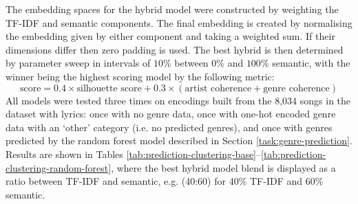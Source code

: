 \documentclass{article}
\begin{document}
The embedding spaces for the hybrid model were constructed by weighting the TF-IDF and semantic components. The final embedding is created by normalising the embedding given by either component and taking a weighted sum. If their dimensions differ then zero padding is used. The best hybrid is then determined by parameter sweep in intervals of $10\%$ between $0\%$ and $100\%$ semantic, with the winner being the highest scoring model by the following metric: $$\text{score} = 0.4 \times \text{silhouette score} + 0.3 \times (\text{artist coherence} + \text{genre coherence})$$
All models were tested three times on encodings built from the 8,034 songs in the dataset with lyrics: once with no genre data, once with one-hot encoded genre data with an `other' category (i.e. no predicted genres), and once with genres predicted by the random forest model described in Section \ref{task:genre-prediction}. Results are shown in Tables \ref{tab:prediction-clustering-base}--\ref{tab:prediction-clustering-random-forest}, where the best hybrid model blend is displayed as a ratio between TF-IDF and semantic, e.g. (40:60) for 40\% TF-IDF and 60\% semantic.
\end{document}
